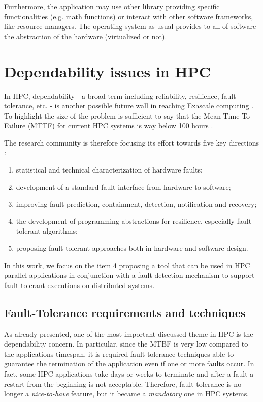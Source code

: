 Furthermore, the application may use other library providing specific
functionalities (e.g. math functions) or interact with
other software frameworks, like resource managers. The operating system as
usual provides to all of software the abstraction of the hardware (virtualized
or not).


\section{Dependability issues in HPC}
In HPC, dependability - a broad term including reliability, resilience,
fault tolerance, etc. - is another possible future wall in reaching
Exascale computing \cite{5871590}. To highlight the
size of the problem is sufficient to say that the Mean Time To Failure (MTTF)
for current HPC systems is way below 100 hours \cite{egwutuoha2013survey}.

The research community is therefore focusing its effort towards five key
directions \cite{cappello2014toward}:
\begin{enumerate}
\item statistical and technical characterization of hardware faults;
\item development of a standard fault interface from hardware to software;
\item improving fault prediction, containment, detection, notification and recovery;
\item the development of programming abstractions for resilience, especially fault-tolerant algorithms;
\item proposing fault-tolerant approaches both in hardware and software design.
\end{enumerate}

In this work, we focus on the item 4 proposing a tool that can be used
in HPC parallel applications in conjunction with a fault-detection mechanism to
support fault-tolerant executions on distributed systems.


\subsection{Fault-Tolerance requirements and techniques}
As already presented, one of the most important discussed theme in HPC is the
dependability concern. In particular, since the MTBF is very low compared
to the applications timespan, it is required fault-tolerance techniques
able to guarantee the termination of the application even if one or more faults
occur. In fact, some HPC applications take days or weeks to terminate and
after a fault a restart from the beginning is not acceptable. Therefore,
fault-tolerance is no longer a \emph{nice-to-have} feature, but it became a
\emph{mandatory} one in HPC systems.

